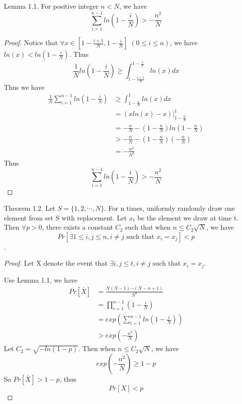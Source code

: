 \documentclass{article}
\begin{document}
\begin{spacing}{1.1}
    \subsection{}
    Lemma 1.1. For positive integer $n < N$, we have
    $$\sum_{i=1}^{n-1}ln(1 - \frac{i}{N}) >-\frac{n^2}{N}$$
    \begin{proof}
        Notice that $\forall x\in [1 -\frac{i+1}{N}, 1 - \frac{i}{N}]$ $(0\leq i\leq n)$, we have $ln(x) < ln(1 - \frac{i}{N})$. Thus
        $$\frac{1}{N}ln(1 - \frac{i}{N}) \geq \int_{1 - \frac{i+1}{N}}^{1 - \frac{i}{N}}ln(x)dx$$
        Thus we have
        \begin{equation}
            \begin{aligned}
                \frac{1}{N}\sum_{i=1}^{n-1}ln(1 - \frac{i}{N}) &\geq \int_{1-\frac{n}{N}}^1 ln(x)dx\\
                &= (xln(x) - x)|_{1-\frac{n}{N}}^1\\
                &= -\frac{n}{N} - (1 - \frac{n}{N})ln(1 - \frac{n}{N})\\
                &> -\frac{n}{N} - (1 - \frac{n}{N})(-\frac{n}{N})\\
                &= - \frac{n^2}{N^2}
            \end{aligned}
        \end{equation}
        Thus
        $$\sum_{i=1}^{n-1}ln(1 - \frac{i}{N}) > -\frac{n^2}{N}$$
    \end{proof}
    Theorem 1.2. Let $S = \{1, 2, \cdots, N\}$. For n times, uniformly randomly draw one element from set S with replacement. Let $x_t$ be the element we draw at time t. Then $\forall p > 0$, there exists a constant $C_2$ such that when $n \leq C_2 \sqrt{N}$, we have
    $$Pr[\exists 1\leq i, j \leq n, i\not = j \text{ such that } x_i = x_j] < p$$.
    \begin{proof}
        Let X denote the event that $\exists i, j \leq t, i\not = j \text{ such that } x_i = x_j$.

        Use Lemma 1.1, we have
        \begin{equation}
            \begin{aligned}
                Pr[\bar{X}] &= \frac{N(N-1)\cdots (N-n+1)}{N^n}\\
                &= \prod_{i=1}^{n-1}(1 - \frac{i}{N})\\
                &= exp(\sum_{i=1}^{n-1}ln(1 - \frac{i}{N}))\\
                &> exp(-\frac{n^2}{N})
            \end{aligned}
        \end{equation}
        Let $C_2 = \sqrt{-ln(1-p)}$. Then when $n \leq C_2\sqrt{N}$, we have
        $$exp(-\frac{n^2}{N}) \geq 1 - p$$
        So $Pr[\bar{X}] > 1 - p$, thus
        $$Pr[X] < p$$
    \end{proof}

\end{spacing}
\end{document}
